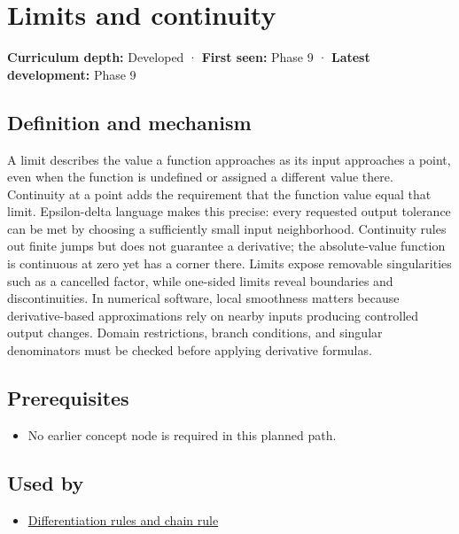 \hypertarget{appendix-fecc1847f5a3}{}\label{referencestart:appendix-fecc1847f5a3}
\section{Limits and continuity}\label{appendix-fecc1847f5a3-limits-and-continuity}

\textbf{Curriculum depth:} Developed · \textbf{First seen:} Phase 9 · \textbf{Latest development:} Phase 9

\subsection{Definition and mechanism}\label{appendix-fecc1847f5a3-definition-and-mechanism}

A limit describes the value a function approaches as its input approaches a point, even when the function is undefined or assigned a different value there. Continuity at a point adds the requirement that the function value equal that limit. Epsilon-delta language makes this precise: every requested output tolerance can be met by choosing a sufficiently small input neighborhood. Continuity rules out finite jumps but does not guarantee a derivative; the absolute-value function is continuous at zero yet has a corner there. Limits expose removable singularities such as a cancelled factor, while one-sided limits reveal boundaries and discontinuities. In numerical software, local smoothness matters because derivative-based approximations rely on nearby inputs producing controlled output changes. Domain restrictions, branch conditions, and singular denominators must be checked before applying derivative formulas.

\subsection{Prerequisites}\label{appendix-fecc1847f5a3-prerequisites}

\begin{itemize}
\tightlist
\item
  No earlier concept node is required in this planned path.
\end{itemize}

\subsection{Used by}\label{appendix-fecc1847f5a3-used-by}

\begin{itemize}
\tightlist
\item
  \hyperref[appendix-d9f70bdfbc92]{Differentiation rules and chain rule}
\end{itemize}


